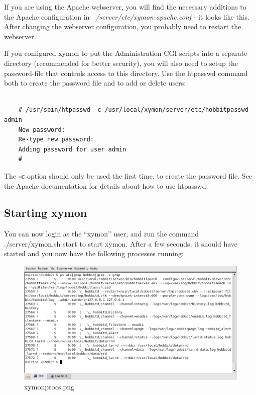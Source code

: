  If you are using the Apache webserver, you will find the necessary additions to the Apache configuration in \emph{~/server/etc/xymon-apache.conf}
 - it looks like this. After changing the webserver configuration, you probably need to restart the webserver.


 If you configured xymon to put the Administration CGI scripts into a separate directory (recommended for better security), you will also need to setup the password-file that controls access to this directory. Use the htpasswd command both to create the password file and to add or delete users:

\begin{verbatim}

	# /usr/sbin/htpasswd -c /usr/local/xymon/server/etc/hobbitpasswd admin
	New password:
	Re-type new password:
	Adding password for user admin
	#

\end{verbatim}



 The \textbf{-c}
 option should only be used the first time, to create the password
 file. See the Apache documentation for details about how to use
 htpasswd.

\subsection{Starting xymon}


 You can now login as the ``xymon'' user, and run the command
 ./server/xymon.sh start to start xymon. After a few seconds, it
 should have started and you now have the following processes running: 


\begin{figure} 
\centering 
\caption{xymonprocs.png}
\label{xymonprocs.png}
\includegraphics[scale=0.6]{./xymonprocs.png} 
\end{figure}

